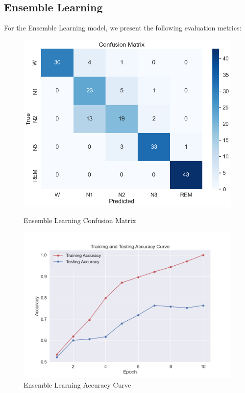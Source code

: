 \subsection{Ensemble Learning}

For the Ensemble Learning model, we present the following evaluation metrics:

\begin{figure}[H]
	\centering
	\begin{minipage}[t]{0.48\textwidth}
		\centering
		\includegraphics[width=\textwidth]{img/paper_1/Ensemble_confusion_matrix.png}
		\caption{Ensemble Learning Confusion Matrix}
	\end{minipage}
	\hfill
	\begin{minipage}[t]{0.48\textwidth}
		\centering
		\includegraphics[width=\textwidth]{img/paper_1/accuracy_curve.png}
		\caption{Ensemble Learning Accuracy Curve}
	\end{minipage}
	

\end{figure}
